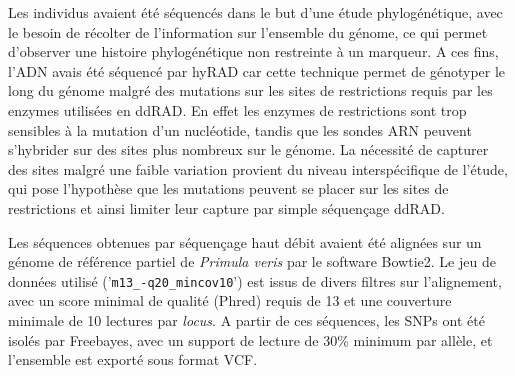 Les individus avaient été séquencés dans le but d'une étude phylogénétique, avec le besoin de récolter de l'information sur l'ensemble du génome, ce qui permet d'observer une histoire phylogénétique non restreinte à un marqueur. A ces fins, l'ADN avais été séquencé par hyRAD \citep{Suchan2016} car cette technique permet de génotyper le long du génome malgré des mutations sur les sites de restrictions requis par les enzymes utilisées en ddRAD. En effet les enzymes de restrictions sont trop sensibles à la mutation d'un nucléotide, tandis que les sondes ARN peuvent s'hybrider sur des sites plus nombreux sur le génome. La nécessité de capturer des sites malgré une faible variation provient du niveau interspécifique de l'étude, qui pose l'hypothèse que les mutations peuvent se placer sur les sites de restrictions et ainsi limiter leur capture par simple séquençage ddRAD. 

Les séquences obtenues par séquençage haut débit avaient été alignées sur un génome de référence partiel de \textit{Primula veris} par le software Bowtie2. Le jeu de données utilisé ('\verb|m13_-q20_mincov10|') est issus de divers filtres sur l'alignement, avec un score minimal de qualité (Phred) requis de 13 et une couverture minimale de 10 lectures par \textit{locus}. A partir de ces séquences, les SNPs ont été isolés par Freebayes, avec un support de lecture de 30\% minimum par allèle, et l'ensemble est exporté sous format VCF.


